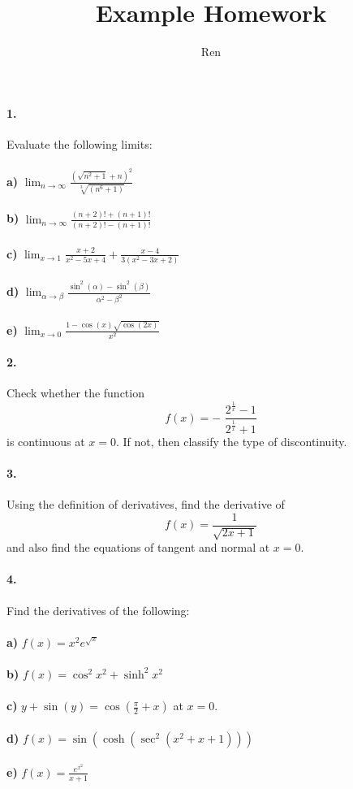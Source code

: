\documentclass[12pt]{article}
\author{Ren}
\title{Example Homework}
\begin{document}
	\paragraph{1.}
	Evaluate the following limits:
	\\
	\\
	\textbf{a)} $ \displaystyle \lim_{n \to \infty} \frac{(\sqrt{n^2+1}+n)^2}{\sqrt[3]{(n^6+1)}}$\\
	\\
	\textbf{b)} $ \displaystyle \lim_{n \to \infty} \frac{(n+2)! + (n+1)!}{(n+2)! - (n+1)!}$\\
	\\
	\textbf{c)} $ \displaystyle \lim_{x \to 1} \frac{x+2}{x^2-5x+4} + \frac{x-4}{3(x^2-3x+2)}$\\
	\\
	\textbf{d)} $ \displaystyle \lim_{\alpha \to \beta} \frac{\sin^2(\alpha)-\sin^2(\beta)}{\alpha^2 - \beta^2}$\\
	\\
	\textbf{e)} $ \displaystyle \lim_{x \to 0} \frac{1-\cos(x)\sqrt{\cos(2x)}}{x^2}$\\
	
	\paragraph{2.}
	Check whether the function
	\textit{
	$$f(x) = - \hspace{4pt}\frac{2^\frac{1}{x}-1}{2^\frac{1}{x}+1}$$
	}
	\hspace{12pt} is continuous at $x=0$. If not, then classify the type of discontinuity.
	
	\paragraph{3.}
	Using the definition of derivatives, find the derivative of
	$$f(x) =  \frac{1}{\sqrt{2x+1}} $$
	\hspace{16pt} and also find the equations of tangent and normal at $x=0$.
	
	\paragraph{4.}
	Find the derivatives of the following:
	\\
	\\
	\textbf{a)} $ \displaystyle f(x)=x^2e^{\sqrt{x}}$\\
	\\
	\textbf{b)} $ \displaystyle f(x) = \cos^2{x^2}+\sinh^2{x^2}$\\
	\\
	\textbf{c)} $ \displaystyle y+\sin(y)=\cos(\frac{\pi}{2}+x)$ at $x=0$.\\
	\\
	\textbf{d)} $ \displaystyle f(x)=\sin(\cosh(\sec^2(x^2+x+1)))$\\
	\\
	\textbf{e)} $ \displaystyle f(x)=\frac{e^{x^2}}{x+1}$\\
	
\end{document}
